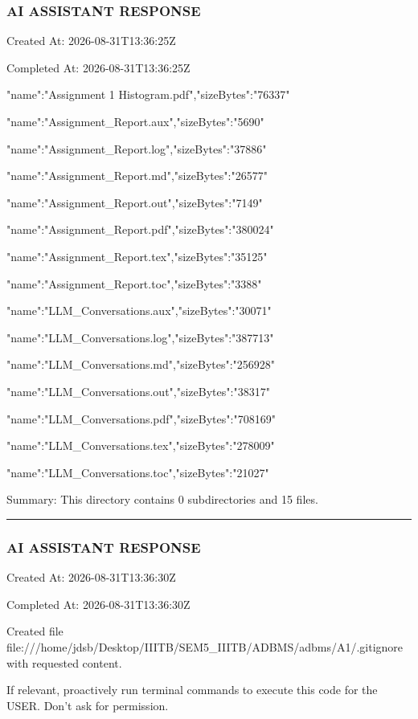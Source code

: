 \documentclass[11pt,a4paper]{article}
\begin{document}
{\subsubsection{AI ASSISTANT RESPONSE}

Created At: 2026-08-31T13:36:25Z

Completed At: 2026-08-31T13:36:25Z

{"name":"Assignment 1 Histogram.pdf","sizeBytes":"76337"}

{"name":"Assignment\_Report.aux","sizeBytes":"5690"}

{"name":"Assignment\_Report.log","sizeBytes":"37886"}

{"name":"Assignment\_Report.md","sizeBytes":"26577"}

{"name":"Assignment\_Report.out","sizeBytes":"7149"}

{"name":"Assignment\_Report.pdf","sizeBytes":"380024"}

{"name":"Assignment\_Report.tex","sizeBytes":"35125"}

{"name":"Assignment\_Report.toc","sizeBytes":"3388"}

{"name":"LLM\_Conversations.aux","sizeBytes":"30071"}

{"name":"LLM\_Conversations.log","sizeBytes":"387713"}

{"name":"LLM\_Conversations.md","sizeBytes":"256928"}

{"name":"LLM\_Conversations.out","sizeBytes":"38317"}

{"name":"LLM\_Conversations.pdf","sizeBytes":"708169"}

{"name":"LLM\_Conversations.tex","sizeBytes":"278009"}

{"name":"LLM\_Conversations.toc","sizeBytes":"21027"}


Summary: This directory contains 0 subdirectories and 15 files.


\hrule

\subsubsection{AI ASSISTANT RESPONSE}

Created At: 2026-08-31T13:36:30Z

Completed At: 2026-08-31T13:36:30Z

Created file file:///home/jdsb/Desktop/IIITB/SEM5\_IIITB/ADBMS/adbms/A1/.gitignore with requested content.

If relevant, proactively run terminal commands to execute this code for the USER. Don't ask for permission.


}
\end{document}
